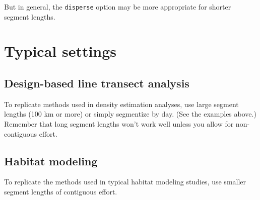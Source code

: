 \documentclass[
]{book}
\newenvironment{Shaded}{\begin{snugshade}}{\end{snugshade}}
\newcommand{\CommentTok}[1]{\textcolor[rgb]{0.56,0.35,0.01}{\textit{#1}}}
\newcommand{\ControlFlowTok}[1]{\textcolor[rgb]{0.13,0.29,0.53}{\textbf{#1}}}
\newcommand{\DataTypeTok}[1]{\textcolor[rgb]{0.13,0.29,0.53}{#1}}
\newcommand{\DecValTok}[1]{\textcolor[rgb]{0.00,0.00,0.81}{#1}}
\newcommand{\FloatTok}[1]{\textcolor[rgb]{0.00,0.00,0.81}{#1}}
\newcommand{\KeywordTok}[1]{\textcolor[rgb]{0.13,0.29,0.53}{\textbf{#1}}}
\newcommand{\NormalTok}[1]{#1}
\newcommand{\OperatorTok}[1]{\textcolor[rgb]{0.81,0.36,0.00}{\textbf{#1}}}
\newcommand{\OtherTok}[1]{\textcolor[rgb]{0.56,0.35,0.01}{#1}}
\newcommand{\StringTok}[1]{\textcolor[rgb]{0.31,0.60,0.02}{#1}}
\begin{document}
But in general, the \texttt{disperse} option may be more appropriate for shorter segment lengths.

\hypertarget{typical-settings}{%
\section*{Typical settings}\label{typical-settings}}

\hypertarget{design-based-line-transect-analysis}{%
\subsection*{Design-based line transect analysis}\label{design-based-line-transect-analysis}}

To replicate methods used in density estimation analyses, use large segment lengths (100 km or more) or simply segmentize by day. (See the examples above.) Remember that long segment lengths won't work well unless you allow for non-contiguous effort.

\hypertarget{habitat-modeling}{%
\subsection*{Habitat modeling}\label{habitat-modeling}}

To replicate the methods used in typical habitat modeling studies, use smaller segment lengths of contiguous effort.

\begin{Shaded}
\end{Shaded}
\end{document}

